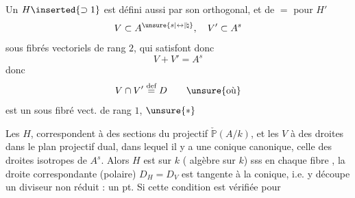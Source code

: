  Un $H\inserted{\supset1}$ est défini aussi par son orthogonal, et de $=$ pour $H'$
\[
V\subset A^{\unsure{s|\leftrightarrow|\natural}},\quad V'\subset A^s
\]
sous fibrés vectoriels de rang $2$, qui satisfont donc
\[
V+V'=A^s
\]
donc
\[
V\cap V'\overset{\text{def}}{=}D\qquad\unsure{\text{où}}
\]
est un sous fibré vect. de rang $1$, $\unsure{*}$

 

Les $H$, correspondent à des sections  du   projectif   $\check{\mathbb{P}}(A/k)$, et les $V$ à des droites dans le plan projectif dual, dans lequel il y a une conique canonique, celle des droites isotropes de $A^s$. Alors $H$ est  sur $k$ ( algèbre sur $k$) sss en chaque  fibre , la droite correspondante (polaire) $D_H=D_V$ est tangente à la conique, i.e. y découpe un diviseur  non réduit : un pt. Si cette condition est vérifiée pour

